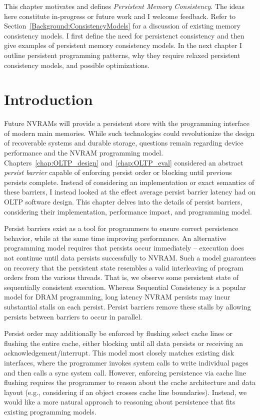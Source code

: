 This chapter motivates and defines \emph{Persistent Memory Consistency}.
The ideas here constitute in-progress or future work and I welcome feedback.
Refer to Section~\ref{Background:ConsistencyModels} for a discussion of existing memory consistency models.
I first define the need for persistenct consistency and then give examples of persistent memory consistency models.
In the next chapter I outline persistent programming patterns, why they require relaxed persistent consistency models, and possible optimizations.

\section{Introduction}
\label{sec:PMC:Intro}

Future NVRAMs will provide a persistent store with the programming interface of modern main memories.
While such technologies could revolutionize the design of recoverable systems and durable storage, questions remain regarding device performance and the NVRAM programming model.
Chapters~\ref{chap:OLTP_design} and~\ref{chap:OLTP_eval} considered an abstract \emph{persist barrier} capable of enforcing persist order or blocking until previous persists complete.
Instead of considering an implementation or exact semantics of these barriers, I instead looked at the effect average persist barrier latency had on OLTP software design.
This chapter delves into the details of persist barriers, considering their implementation, performance impact, and programming model.

Persist barriers exist as a tool for programmers to ensure correct persistence behavior, while at the same time improving performance.
An alternative programming model requires that persists occur immediately -- execution does not continue until data persists successfully to NVRAM.
Such a model guarantees on recovery that the persistent state resembles a valid interleaving of program orders from the various threads.
That is, we observe some persistent state of sequentially consistent execution.
Whereas Sequential Consistency is a popular model for DRAM programming, long latency NVRAM persists may incur substantial stalls on each persist.
Persist barriers remove these stalls by allowing persists between barriers to occur in parallel.

Persist order may additionally be enforced by flushing select cache lines or flushing the entire cache, either blocking until all data persists or receiving an acknowledgement/interrupt.
This model most closely matches existing disk interfaces, where the programmer invokes system calls to write individual pages and then calls a sync system call.
However, enforcing persistence via cache line flushing requires the programmer to reason about the cache architecture and data layout (e.g., considering if an object crosses cache line boundaries).
Instead, we would like a more natural approach to reasoning about persistence that fits existing programming models.

